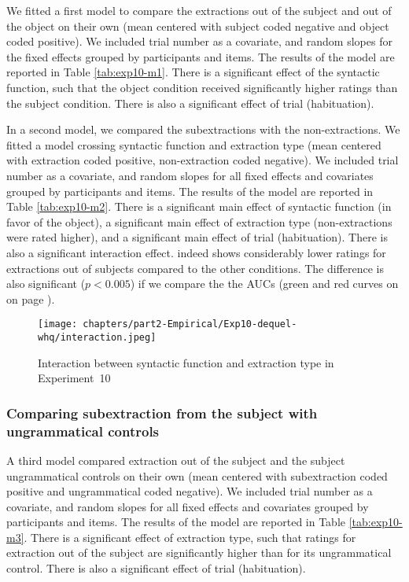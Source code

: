 We fitted a first model to compare the extractions out of the subject and out of the object on their own (mean centered with subject coded negative and object coded positive). We included trial number as a covariate, and random slopes for the fixed effects grouped by participants and items. The results of the model are reported in Table \ref{tab:exp10-m1}. 
There is a significant effect of the syntactic function, such that the object condition received significantly higher ratings than the subject condition. There is also a significant effect of trial (habituation).



In a second model, we compared the subextractions with the non-extractions. We fitted a model crossing syntactic function and extraction type (mean centered with extraction coded positive, non-extraction coded negative). We included trial number as a covariate, and random slopes for all fixed effects and covariates grouped by participants and items. The results of the model are reported in Table \ref{tab:exp10-m2}. 
There is a significant main effect of syntactic function (in favor of the object), a significant main effect of extraction type (non-extractions were rated higher), and a significant main effect of trial (habituation). There is also a significant interaction effect.  indeed shows considerably lower ratings for extractions out of subjects compared to the other conditions. The difference is also significant ($p < 0.005$) if we compare the the AUCs (green and red curves on  on page \pageref{fig:exp10-ROC-subj}). 



\begin{figure}
    \centering
    \texttt{[image: chapters/part2-Empirical/Exp10-dequel-whq/interaction.jpeg]}
    \caption{Interaction between syntactic function and extraction type in Experiment~10}
    \label{fig:exp10-interaction}
\end{figure}

\subsubsection{Comparing subextraction from the subject with ungrammatical controls}

A third model compared extraction out of the subject and the subject ungrammatical controls on their own (mean centered with subextraction coded positive and ungrammatical coded negative). We included trial number as a covariate, and random slopes for all fixed effects and covariates grouped by participants and items. The results of the model are reported in Table \ref{tab:exp10-m3}. There is a significant effect of extraction type, such that ratings for extraction out of the subject are significantly higher than for its ungrammatical control. There is also a significant effect of trial (habituation).

